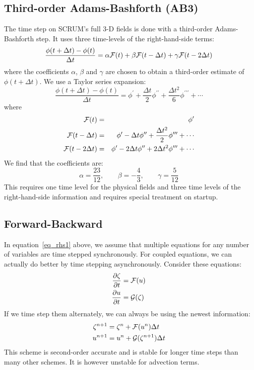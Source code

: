 \subsection{Third-order Adams-Bashforth (AB3)}
The time step on SCRUM's full 3-D fields is done with
a third-order Adams-Bashforth step.  It uses three time-levels of the
right-hand-side terms:
\begin{equation}
  \frac{\phi(t + \Delta t) - \phi(t)}{\Delta t} =
  \alpha {\cal F}(t) +
  \beta  {\cal F}(t - \Delta t) +
  \gamma {\cal F}(t - 2 \Delta t)
\end{equation}
where the coefficients $\alpha$, $\beta$ and $\gamma$ are chosen to
obtain a third-order estimate of $\phi(t + \Delta t)$.  We use a Taylor
series expansion:
\begin{equation}
   \frac{\phi(t + \Delta t) - \phi(t)}{\Delta t} =
   \phi^{\prime} + \frac{\Delta t}{2} \phi^{\prime \prime} +
   \frac{\Delta t^2}{6} \phi^{\prime \prime \prime} + \cdots
\end{equation}
where
\begin{eqnarray*}
   {\cal F}(t) & = & \phi^{\prime} \\
   {\cal F}(t - \Delta t) & = & \phi^{\prime}
   - \Delta t \phi^{\prime \prime}
   + \frac{\Delta t^2}{2} \phi^{\prime \prime \prime} + \cdots \\
   {\cal F}(t - 2\Delta t) & = & \phi^{\prime}
   - 2\Delta t \phi^{\prime \prime}
   + 2\Delta t^2 \phi^{\prime \prime \prime} + \cdots
\end{eqnarray*}
We find that the coefficients are:
$$
   \alpha = \frac{23}{12}, \qquad
   \beta  = - \frac{4}{3}, \qquad
   \gamma = \frac{5}{12} 
$$
This requires one time level for the physical fields and three time
levels of the right-hand-side information and requires special
treatment on startup.

\subsection{Forward-Backward}
In equation~\ref{eq_rhs1} above, we assume that multiple equations 
for any number of variables are time stepped synchronously. For
coupled equations, we can actually do better by time stepping
asynchronously. Consider these equations:
\begin{equation}\begin{split}
  \frac{\partial \zeta}{\partial t} &= {\cal F}(u) \\
  \frac{\partial u}{\partial t} &= {\cal G}(\zeta)
  \label{two_eqs}
\end{split}\end{equation}
If we time step them alternately, we can always be using the newest
information:
\begin{equation}\begin{split}
   \zeta^{n+1} &= \zeta^n + {\cal F}(u^n) \Delta t \\
   u^{n+1} &= u^n + {\cal G}(\zeta^{n+1}) \Delta t
\end{split}\end{equation}
This scheme is second-order accurate and is stable for longer
time steps than many other schemes. It is however unstable for
advection terms.

